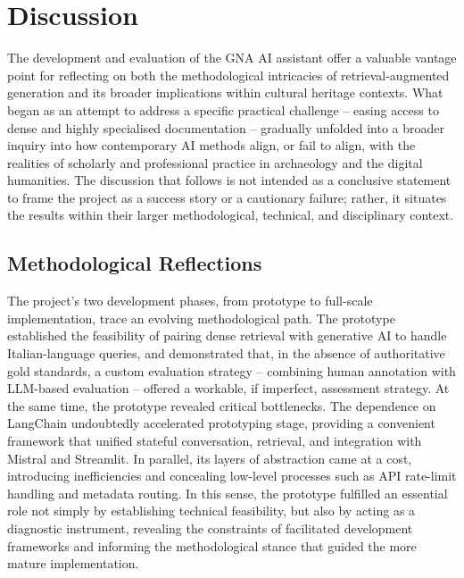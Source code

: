 \chapter{Discussion}
\label{chap:discussion}
\begin{spacing}{1.5}
The development and evaluation of the GNA AI assistant offer a valuable vantage point for reflecting on both the methodological intricacies of retrieval-augmented generation and its broader implications within cultural heritage contexts. What began as an attempt to address a specific practical challenge -- easing access to dense and highly specialised documentation -- gradually unfolded into a broader inquiry into how contemporary AI methods align, or fail to align, with the realities of scholarly and professional practice in archaeology and the digital humanities. The discussion that follows is not intended as a conclusive statement to frame the project as a success story or a cautionary failure; rather, it situates the results within their larger methodological, technical, and disciplinary context.

\section{Methodological Reflections}
The project’s two development phases, from prototype to full-scale implementation, trace an evolving methodological path. The prototype established the feasibility of pairing dense retrieval with generative AI to handle Italian-language queries, and demonstrated that, in the absence of authoritative gold standards, a custom evaluation strategy -- combining human annotation with LLM-based evaluation -- offered a workable, if imperfect, assessment strategy. At the same time, the prototype revealed critical bottlenecks. The dependence on LangChain undoubtedly accelerated prototyping stage, providing a convenient framework that unified stateful conversation, retrieval, and integration with Mistral and Streamlit. In parallel, its layers of abstraction came at a cost, introducing inefficiencies and concealing low-level processes such as API rate-limit handling and metadata routing. In this sense, the prototype fulfilled an essential role not simply by establishing technical feasibility, but also by acting as a diagnostic instrument, revealing the constraints of facilitated development frameworks and informing the methodological stance that guided the more mature implementation.


\end{spacing}
